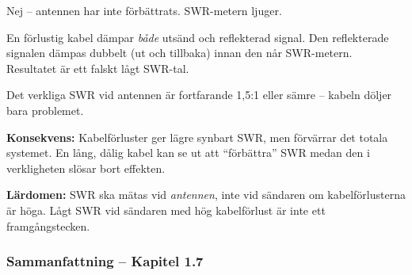 \documentclass[a4paper,11pt,twoside]{book}
\begin{document}
\begin{worked}[title={Lösning -- Fallgropsfråga 1.7.8\,F}]
Nej -- antennen har inte förbättrats. SWR-metern 
ljuger.

En förlustig kabel dämpar \emph{både} utsänd och 
reflekterad signal. Den reflekterade signalen dämpas 
dubbelt (ut och tillbaka) innan den når SWR-metern. 
Resultatet är ett falskt lågt SWR-tal.

Det verkliga SWR vid antennen är fortfarande 1,5:1 
eller sämre -- kabeln döljer bara problemet.

\textbf{Konsekvens:} Kabelförluster ger lägre 
synbart SWR, men förvärrar det totala systemet. 
En lång, dålig kabel kan se ut att ``förbättra'' 
SWR medan den i verkligheten slösar bort effekten.

\textbf{Lärdomen:} SWR ska mätas vid \emph{antennen}, 
inte vid sändaren om kabelförlusterna är höga. 
Lågt SWR vid sändaren med hög kabelförlust är 
inte ett framgångstecken.
\end{worked}


\subsubsection*{Sammanfattning -- Kapitel 1.7}
\end{document}
